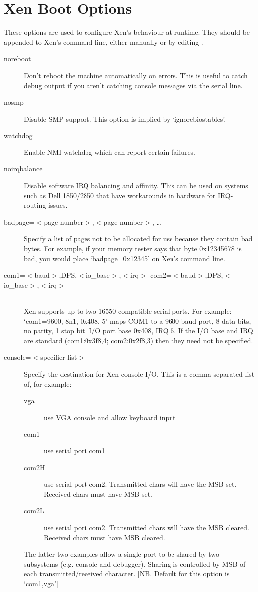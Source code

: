 \documentclass[11pt,twoside,final,openright]{report}
\begin{document}
{\section{Xen Boot Options}
\label{s:xboot}

These options are used to configure Xen's behaviour at runtime.  They
should be appended to Xen's command line, either manually or by
editing .

\begin{description}
\item [noreboot ] 
 Don't reboot the machine automatically on errors.  This is
 useful to catch debug output if you aren't catching console messages
 via the serial line. 

\item [nosmp ] 
 Disable SMP support.
 This option is implied by `ignorebiostables'. 

\item [watchdog ] 
 Enable NMI watchdog which can report certain failures. 

\item [noirqbalance ] 
 Disable software IRQ balancing and affinity. This can be used on
 systems such as Dell 1850/2850 that have workarounds in hardware for
 IRQ-routing issues.

\item [badpage=$<$page number$>$,$<$page number$>$, \ldots ] 
 Specify a list of pages not to be allocated for use 
 because they contain bad bytes. For example, if your
 memory tester says that byte 0x12345678 is bad, you would
 place `badpage=0x12345' on Xen's command line. 

\item [com1=$<$baud$>$,DPS,$<$io\_base$>$,$<$irq$>$
 com2=$<$baud$>$,DPS,$<$io\_base$>$,$<$irq$>$ ] \mbox{}\\ 
 Xen supports up to two 16550-compatible serial ports.
 For example: `com1=9600, 8n1, 0x408, 5' maps COM1 to a
 9600-baud port, 8 data bits, no parity, 1 stop bit,
 I/O port base 0x408, IRQ 5.
 If the I/O base and IRQ are standard (com1:0x3f8,4;
 com2:0x2f8,3) then they need not be specified. 

\item [console=$<$specifier list$>$ ] 
 Specify the destination for Xen console I/O.
 This is a comma-separated list of, for example:
\begin{description}
 \item[vga]  use VGA console and allow keyboard input
 \item[com1] use serial port com1
 \item[com2H] use serial port com2. Transmitted chars will
   have the MSB set. Received chars must have
   MSB set.
 \item[com2L] use serial port com2. Transmitted chars will
   have the MSB cleared. Received chars must
   have MSB cleared.
\end{description}
 The latter two examples allow a single port to be
 shared by two subsystems (e.g. console and
 debugger). Sharing is controlled by MSB of each
 transmitted/received character.
 [NB. Default for this option is `com1,vga'] 


\end{description}}
\end{document}
